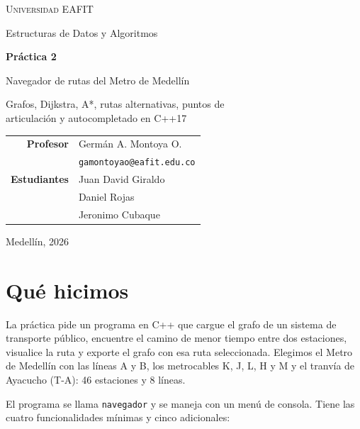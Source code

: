 \documentclass[11pt,a4paper]{article}
\newcommand{\arch}[1]{\texttt{#1}}
\begin{document}
\shorthandoff{<>}

\begin{titlepage}
\centering
{\scshape\large Universidad EAFIT\par}
\vspace{0.3cm}
{\large Estructuras de Datos y Algoritmos\par}
\vspace{2.2cm}
{\Huge\bfseries Práctica 2\par}
\vspace{0.6cm}
{\Large Navegador de rutas del Metro de Medellín\par}
\vspace{0.8cm}
{\large Grafos, Dijkstra, A*, rutas alternativas, puntos de\\ articulación y autocompletado en C++17\par}
\vfill
\begin{tabular}{r@{\hspace{0.6cm}}l}
\textbf{Profesor} & Germán A. Montoya O. \\
 & \texttt{gamontoyao@eafit.edu.co} \\[0.4cm]
\textbf{Estudiantes} & Juan David Giraldo \\
 & Daniel Rojas \\
 & Jeronimo Cubaque \\
\end{tabular}
\vfill
{\large Medellín, 2026\par}
\end{titlepage}

\section{Qué hicimos}

La práctica pide un programa en C++ que cargue el grafo de un sistema de
transporte público, encuentre el camino de menor tiempo entre dos estaciones,
visualice la ruta y exporte el grafo con esa ruta seleccionada. Elegimos el Metro
de Medellín con las líneas A y B, los metrocables K, J, L, H y M y el tranvía de
Ayacucho (T-A): 46 estaciones y 8 líneas.

El programa se llama \arch{navegador} y se maneja con un menú de consola. Tiene
las cuatro funcionalidades mínimas y cinco adicionales:
\end{document}
